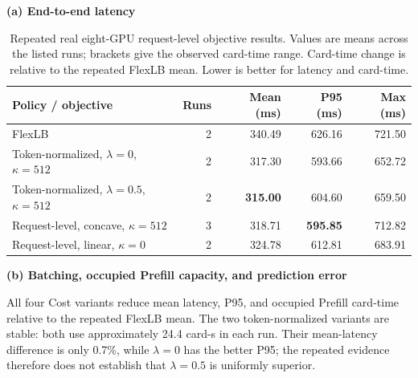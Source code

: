 \documentclass[10pt]{article}
\begin{document}
\begin{table}[t]
\centering
\small
\caption{Repeated real eight-GPU request-level objective results. Values are
means across the listed runs; brackets give the observed card-time range.
Card-time change is relative to the repeated FlexLB mean. Lower is better for
latency and card-time.}
\label{tab:request-latency-objective}
\textbf{(a) End-to-end latency}\\[0.35em]
\begin{tabular}{lrrrr}
\toprule
Policy / objective & Runs & Mean (ms) & P95 (ms) & Max (ms) \\
\midrule
FlexLB & 2 & 340.49 & 626.16 & 721.50 \\
Token-normalized, $\lambda=0$, $\kappa=512$
  & 2 & 317.30 & 593.66 & 652.72 \\
Token-normalized, $\lambda=0.5$, $\kappa=512$
  & 2 & \textbf{315.00} & 604.60 & 659.50 \\
Request-level, concave, $\kappa=512$
  & 3 & 318.71 & \textbf{595.85} & 712.82 \\
Request-level, linear, $\kappa=0$
  & 2 & 324.78 & 612.81 & 683.91 \\
\bottomrule
\end{tabular}

\vspace{0.8em}
\textbf{(b) Batching, occupied Prefill capacity, and prediction error}\\[0.35em]
\end{table}

All four Cost variants reduce mean latency, P95, and occupied Prefill
card-time relative to the repeated FlexLB mean. The two token-normalized
variants are stable: both use approximately 24.4 card-s in each run. Their
mean-latency difference is only 0.7\%, while $\lambda=0$ has the better P95;
the repeated evidence therefore does not establish that $\lambda=0.5$ is
uniformly superior.
\end{document}
